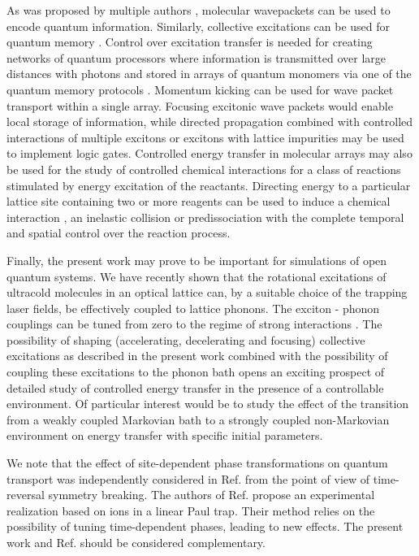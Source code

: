As was proposed by multiple authors \cite{QI-wavepacket1,QI-wavepacket2,QI-wavepacket3,
QI-wavepacket4,QI-wavepacket5,QI-wavepacket6}, molecular wavepackets can be used to 
encode quantum information.  Similarly, collective excitations can be used for quantum memory
\cite{peter-rabl, peter-rabl2}.
Control over excitation transfer is needed for creating networks
of quantum processors where information is transmitted over large
distances with photons and stored in arrays of quantum monomers
via one of the quantum memory protocols \cite{Lvovsky-Qmemories}.
Momentum kicking can be used for wave packet transport within a
single array. Focusing excitonic wave packets would enable local
storage of information, while directed propagation combined with controlled interactions of multiple
excitons \cite{biexcitons} or excitons with lattice impurities
\cite{zoller-atom-transistor} may be used to implement logic
gates. Controlled energy transfer in molecular arrays may also be used
for the study of controlled chemical interactions for a class of
reactions stimulated by energy excitation of the reactants.
Directing  energy  to a particular lattice site containing
two or more reagents can be used to induce a chemical interaction
\cite{pccp}, an inelastic collision or predissociation
\cite{wallis-krems}  with the complete temporal and spatial
control over the reaction process.

Finally, the present work may prove to be important for simulations of open quantum systems. 
We have recently shown \cite{felipe, felipe-arxive-polaron} that
the rotational excitations of ultracold molecules in an optical lattice can,
by a suitable choice of the trapping laser fields, be effectively coupled to lattice phonons.
The exciton - phonon couplings can be tuned from zero to the regime of strong interactions
\cite{felipe, felipe-arxive-polaron}. The possibility of shaping (accelerating, decelerating and focusing)
collective excitations as described in the present work combined with the possibility of coupling these excitations
to the phonon bath opens an exciting prospect of detailed study of controlled energy transfer in the presence of a
controllable environment. Of particular interest would be to study the effect of the transition from a weakly coupled
Markovian bath to a strongly coupled non-Markovian environment on energy transfer with specific initial parameters.


We note that  the effect of site-dependent phase transformations on quantum transport was independently considered 
in Ref.  \cite{zimboras2012} from the point of view of time-reversal symmetry breaking. The authors of Ref.  \cite{zimboras2012} propose 
an experimental realization based on ions in a linear Paul trap. Their method relies on the possibility of tuning time-dependent phases, 
leading to new effects. The present work and Ref. \cite{zimboras2012} should be considered complementary. 








